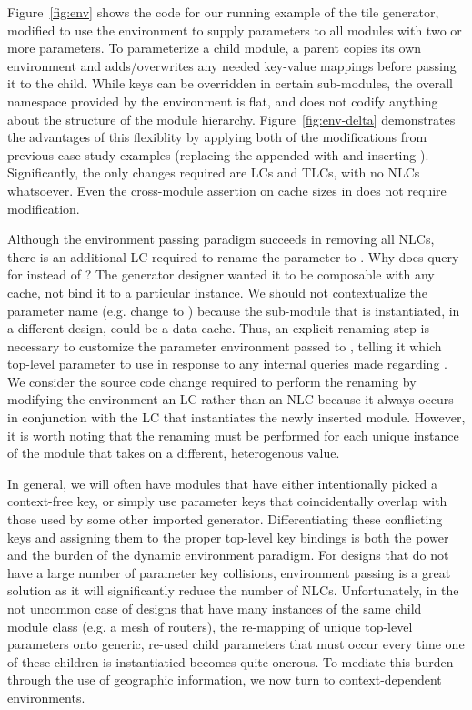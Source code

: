 Figure~\ref{fig:env} shows the code for our running example of the tile generator, modified to use the environment to supply parameters to all modules with two or more parameters.
To parameterize a child module, a parent copies its own environment and adds/overwrites any needed key-value mappings before passing it to the child.
While keys can be overridden in certain sub-modules, the overall namespace provided by the environment is flat, and does not codify anything about the structure of the module hierarchy.
Figure~\ref{fig:env-delta} demonstrates the advantages of this flexiblity by applying both of the modifications from previous case study examples
(replacing the appended  with  and inserting ).
Significantly, the only changes required are LCs and TLCs, with no NLCs whatsoever.
Even the cross-module assertion on cache sizes in  does not require modification.

Although the environment passing paradigm succeeds in removing all NLCs,
there is an additional LC required to rename the  parameter to .
Why does  query for  instead of ?
The generator designer wanted it to be composable with any cache, not bind it to a particular instance.
We should not contextualize the parameter name (e.g. change  to ) because the sub-module that is instantiated, in a different design, could be a data cache. 
Thus, an explicit renaming step is necessary to customize the parameter environment passed to , telling it which top-level parameter to use
in response to any internal queries made regarding .
We consider the source code change required to perform the renaming by modifying the environment an LC rather than an NLC because it always occurs in conjunction
with the LC that instantiates the newly inserted module.
However, it is worth noting that the renaming must be performed for each unique instance of the module that takes on a different, heterogenous value.

In general, we will often have modules that have either intentionally picked a context-free key, or simply use parameter keys that coincidentally overlap with those
used by some other imported generator.
Differentiating these conflicting keys and assigning them to the proper top-level key bindings is both the power and the burden of the dynamic environment paradigm.
For designs that do not have a large number of parameter key collisions, environment passing is a great solution as it will significantly reduce the number of NLCs. 
Unfortunately, in the not uncommon case of designs that have many instances of the same child module class (e.g. a mesh of routers), the re-mapping of unique top-level parameters onto generic, re-used child parameters
that must occur every time one of these children is instantiatied becomes quite onerous.
To mediate this burden through the use of geographic information, we now turn to context-dependent environments.

